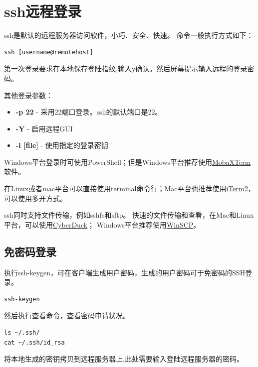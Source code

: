 \documentclass[
]{ctexbook}
\providecommand{\tightlist}{%
  \setlength{\itemsep}{0pt}\setlength{\parskip}{0pt}}
\begin{document}
\hypertarget{ssh}{%
\section{ssh远程登录}\label{ssh}}

ssh是默认的远程服务器访问软件，小巧、安全、快速。
命令一般执行方式如下：

\begin{verbatim}
ssh [username@remotehost]
\end{verbatim}

第一次登录要求在本地保存登陆指纹,输入y确认。然后屏幕提示输入远程的登录密码。

其他登录参数：

\begin{itemize}
\tightlist
\item
  \textbf{-p 22} - 采用22端口登录。ssh的默认端口是22。
\item
  \textbf{-Y} - 启用远程GUI
\item
  \textbf{-i {[}file{]}} - 使用指定的登录密钥
\end{itemize}

Windows平台登录时可使用PowerShell；但是Windows平台推荐使用\href{https://mobaxterm.mobatek.net}{MobaXTerm}软件。

在Linux或者mac平台可以直接使用terminal命令行；Mac平台也推荐使用\href{https://iterm2.com}{iTerm2}，可以使用多开方式。

ssh同时支持文件传输，例如sshfs和sftp。 快速的文件传输和查看，在Mac和Linux平台，可以使用\href{https://cyberduck.io}{CyberDuck}； Windows平台推荐使用\href{https://winscp.net}{WinSCP}。

\hypertarget{ux514dux5bc6ux7801ux767bux5f55}{%
\subsection{免密码登录}\label{ux514dux5bc6ux7801ux767bux5f55}}

执行ssh-keygen，可在客户端生成用户密码，生成的用户密码可于免密码的SSH登录。

\begin{verbatim}
ssh-keygen
\end{verbatim}

然后执行查看命令，查看密码申请状况。

\begin{verbatim}
ls ~/.ssh/
cat ~/.ssh/id_rsa
\end{verbatim}

将本地生成的密钥拷贝到远程服务器上,此处需要输入登陆远程服务器的密码。
\end{document}
